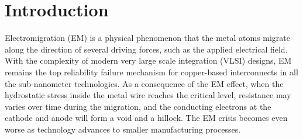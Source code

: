 \section{Introduction}
\label{sec:intro}
Electromigration (EM) is a physical phenomenon that the metal atoms migrate along the direction of several driving forces, such as the applied electrical field. 
With the complexity of modern very large scale integration (VLSI) designs, EM remains the top reliability failure mechanism for copper-based interconnects in all the sub-nanometer technologies.
As a consequence of the EM effect, when the hydrostatic stress inside the metal wire reaches the critical level, resistance may varies over time during the migration, and the conducting electrons at the cathode and anode will form a void and a hillock.
The EM crisis becomes even worse as technology advances to smaller manufacturing processes. 


